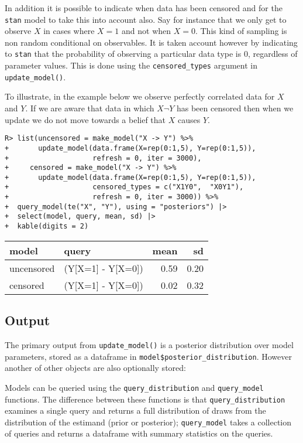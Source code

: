 \documentclass[
  11pt,
  article]{jss}
\begin{document}
In addition it is possible to indicate when data has been censored and
for the \texttt{stan} model to take this into account also. Say for
instance that we only get to observe \(X\) in cases where \(X=1\) and
not when \(X=0\). This kind of sampling is non random conditional on
observables. It is taken account however by indicating to \texttt{stan}
that the probability of observing a particular data type is 0,
regardless of parameter values. This is done using the
\texttt{censored\_types} argument in \texttt{update\_model()}.

To illustrate, in the example below we observe perfectly correlated data
for \(X\) and \(Y\). If we are aware that data in which \(X \neg Y\) has
been censored then when we update we do not move towards a belief that
\(X\) causes \(Y\).

\begin{verbatim}
R> list(uncensored = make_model("X -> Y") %>%
+       update_model(data.frame(X=rep(0:1,5), Y=rep(0:1,5)),
+                    refresh = 0, iter = 3000),
+     censored = make_model("X -> Y") %>%
+       update_model(data.frame(X=rep(0:1,5), Y=rep(0:1,5)),
+                    censored_types = c("X1Y0",  "X0Y1"),
+                    refresh = 0, iter = 3000)) %>%
+  query_model(te("X", "Y"), using = "posteriors") |>
+  select(model, query, mean, sd) |>
+  kable(digits = 2)
\end{verbatim}

\begin{tabular}{l|l|r|r}
\hline
model & query & mean & sd\\
\hline
uncensored & (Y[X=1] - Y[X=0]) & 0.59 & 0.20\\
\hline
censored & (Y[X=1] - Y[X=0]) & 0.02 & 0.32\\
\hline
\end{tabular}

\hypertarget{output}{%
\subsection{Output}\label{output}}

The primary output from \texttt{update\_model()} is a posterior
distribution over model parameters, stored as a dataframe in
\texttt{model\$posterior\_distribution}. However another of other
objects are also optionally stored:

Models can be queried using the \texttt{query\_distribution} and
\texttt{query\_model} functions. The difference between these functions
is that \texttt{query\_distribution} examines a single query and returns
a full distribution of draws from the distribution of the estimand
(prior or posterior); \texttt{query\_model} takes a collection of
queries and returns a dataframe with summary statistics on the queries.
\end{document}
